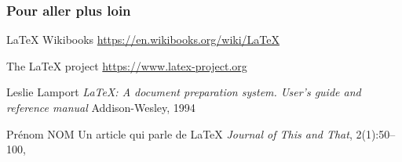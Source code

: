 \begin{frame}[allowframebreaks]
  \frametitle<presentation>{Pour aller plus loin}
    
  \begin{thebibliography}{10}
    
    \beamertemplateonlinebibitems
    
    \LaTeX{} Wikibooks
    \newblock \url{https://en.wikibooks.org/wiki/LaTeX}
      
    The \LaTeX{} project
    \newblock \url{https://www.latex-project.org}

    \beamertemplatebookbibitems
    
    Leslie Lamport
    \newblock \emph{LaTeX: A document preparation system. User's guide and reference manual}
    \newblock Addison-Wesley, 1994
    
    \beamertemplatearticlebibitems

    Prénom NOM
    \newblock Un article qui parle de LaTeX
    \newblock \emph{Journal of This and That}, 2(1):50--100,

  \end{thebibliography}
\end{frame}
  
